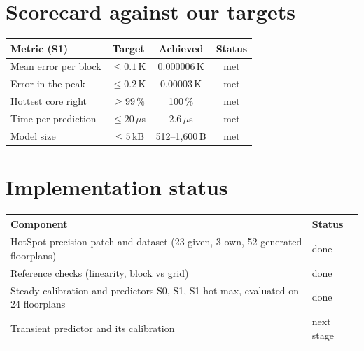 \documentclass[11pt,a4paper]{article}
\newcommand{\us}{\,$\mu$s}
\begin{document}
\section{Scorecard against our targets}
\begin{center}
\small
\begin{tabular}{@{}l c c c@{}}
\toprule
Metric (S1) & Target & Achieved & Status \\
\midrule
Mean error per block & $\le 0.1$\,K & 0.000006\,K & met \\
Error in the peak & $\le 0.2$\,K & 0.00003\,K & met \\
Hottest core right & $\ge 99\,\%$ & 100\,\% & met \\
Time per prediction & $\le 20$\us & 2.6\us & met \\
Model size & $\le 5$\,kB & 512--1{,}600\,B & met \\
\bottomrule
\end{tabular}
\end{center}

\section{Implementation status}
\begin{center}
\small
\begin{tabular}{@{}l l@{}}
\toprule
Component & Status \\
\midrule
HotSpot precision patch and dataset (23 given, 3 own, 52 generated floorplans) & done \\
Reference checks (linearity, block vs grid) & done \\
Steady calibration and predictors S0, S1, S1-hot-max, evaluated on 24 floorplans & done \\
Transient predictor and its calibration & next stage \\
\bottomrule
\end{tabular}
\end{center}

\end{document}
